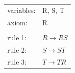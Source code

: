 \documentclass[10pt,a4paper,boxed]{hmcpset}
\begin{document}
\begin{problem}[Assignment 28]
\end{problem}
\begin{solution}
	\begin{tabular}{ll}
	 variables: & R, S, T\\ 
	 axiom: & R \\
	 		& \\
	 rule 1: & $R \rightarrow RS$ \\
	 rule 2: & $S \rightarrow ST$ \\
	 rule 3: & $T \rightarrow TR$ \\
	\end{tabular}
\end{solution}

\newpage

\begin{problem}[Assignment 29]
\end{problem}
\end{document}
